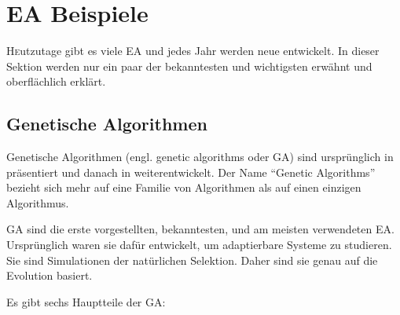 \documentclass[twoside,twocolumn]{article}
\begin{document}

\section{EA Beispiele}
\lettrine[nindent=0em,lines=3]{H} eutzutage gibt es viele EA und jedes Jahr werden neue entwickelt. In dieser Sektion werden nur ein paar der bekanntesten und wichtigsten erwähnt und oberflächlich erklärt.

\subsection{Genetische Algorithmen}
Genetische Algorithmen (engl. genetic algorithms oder GA) sind ursprünglich in \cite{holland_ga} präsentiert und danach in \cite{goldberg_ga} weiterentwickelt. Der Name \enquote{Genetic Algorithms} bezieht sich mehr auf eine Familie von Algorithmen als auf einen einzigen Algorithmus.\par
GA sind die erste vorgestellten, bekanntesten, und am meisten verwendeten EA. Ursprünglich waren sie dafür entwickelt, um adaptierbare Systeme zu studieren. Sie sind Simulationen der natürlichen Selektion. Daher sind sie genau auf die Evolution basiert.\par
Es gibt sechs Hauptteile der GA:
\end{document}
